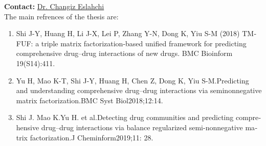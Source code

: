 \begin{latin}
{\newline
\textbf{Contact:} \href{ch-eslahchi@sbu.ac.i }{Dr. Changiz Eslahchi}\\
\newline
The main refrences of the thesis are:
	\begin{enumerate}
		\item Shi J-Y, Huang H, Li J-X, Lei P, Zhang Y-N, Dong K, Yiu S-M (2018) TMFUF: a triple matrix factorization-based unified framework for predicting comprehensive drug–drug interactions of new drugs. BMC Bioinform 19(S14):411.
		\item Yu H, Mao K-T, Shi J-Y, Huang H, Chen Z, Dong K, Yiu S-M.Predicting and understanding comprehensive drug–drug interactions via seminonnegative matrix factorization.BMC Syst Biol2018;12:14.	
		\item Shi J. Mao K.Yu H. et al.Detecting drug communities and predicting comprehensive drug–drug interactions via balance regularized semi-nonnegative matrix factorization.J Cheminform2019;11: 28.
	\end{enumerate}
}
\latinvtitle
\end{latin}